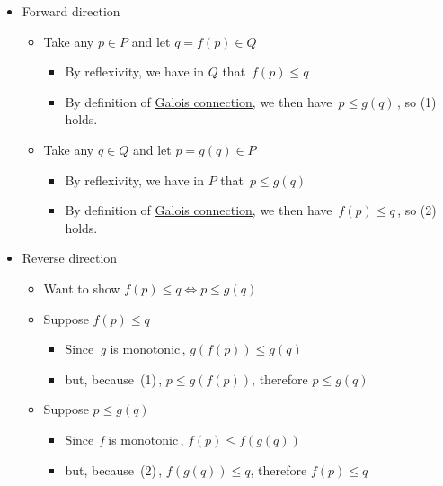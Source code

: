 \begin{itemize}
    \item Forward direction
          \begin{itemize}
            \item Take any $p \in P$ and let $q = f(p) \in Q$
                  \begin{itemize}
                    \item By reflexivity, we have in $Q$ that \,$f(p) \leq q$\,
                    \item By definition of \href{doc/1 math/Seven Sketches in Compositionality/Chapter 1: Generative Effects/6 Galois connections/1 Definition and examples/Galois connection}{Galois connection}, we then have \,$p \leq g(q)$\,, so (1) holds.
                  \end{itemize}
            \item Take any $q \in Q$ and let $p = g(q) \in P$
                  \begin{itemize}
                    \item By reflexivity, we have in $P$ that \,$p \leq g(q)$\,
                    \item By definition of \href{doc/1 math/Seven Sketches in Compositionality/Chapter 1: Generative Effects/6 Galois connections/1 Definition and examples/Galois connection}{Galois connection}, we then have \,$f(p) \leq q$\,, so (2) holds.
                  \end{itemize}
          \end{itemize}

    \item Reverse direction
          \begin{itemize}
            \item Want to show $f(p)\leq q \iff p \leq g(q)$
            \item Suppose $f(p) \leq q$
                  \begin{itemize}
                    \item Since \,\emph{g} is monotonic\,, $g(f(p)) \leq g(q)$
                    \item but, because \,(1)\,, $p \leq g(f(p))$, therefore $p \leq g(q)$
                  \end{itemize}
            \item Suppose $p \leq g(q)$
                  \begin{itemize}
                    \item Since \,\emph{f} is monotonic\,, $f(p) \leq f(g(q))$
                    \item but, because \,(2)\,, $f(g(q)) \leq q$, therefore $f(p) \leq q$\end{itemize}
          \end{itemize}
  \end{itemize}